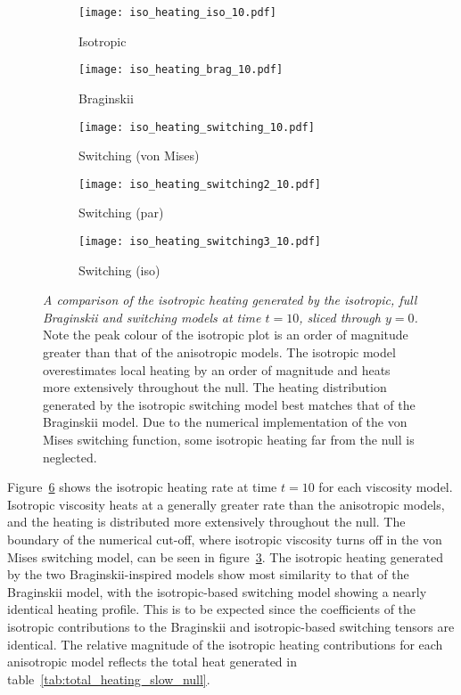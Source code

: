 \begin{figure}[t]
    \centering
    \hfill
    \begin{subfigure}{0.32\textwidth}
      \texttt{[image: iso\_heating\_iso\_10.pdf]}
      \caption{Isotropic}%
      \label{fig:iso_heating_iso_10}
    \end{subfigure}
    \hfill
    \begin{subfigure}{0.32\textwidth}
      \texttt{[image: iso\_heating\_brag\_10.pdf]}
      \caption{Braginskii}%
      \label{fig:iso_heating_brag_10}
    \end{subfigure}
    \hfill
    \begin{subfigure}{0.32\textwidth}
      \texttt{[image: iso\_heating\_switching\_10.pdf]}
      \caption{Switching (von Mises)}%
      \label{fig:iso_heating_switching_10}
    \end{subfigure}
    \begin{subfigure}{0.32\textwidth}
      \texttt{[image: iso\_heating\_switching2\_10.pdf]}
      \caption{Switching (par)}%
      \label{fig:iso_heating_switching2_10}
    \end{subfigure}
    \begin{subfigure}{0.32\textwidth}
      \texttt{[image: iso\_heating\_switching3\_10.pdf]}
      \caption{Switching (iso)}%
      \label{fig:iso_heating_switching3_10}
    \end{subfigure}

    \caption{\emph{A comparison of the isotropic heating generated by the isotropic, full Braginskii and switching models at time $t=10$, sliced through $y=0$.} Note the peak colour of the isotropic plot is an order of magnitude greater than that of the anisotropic models. The isotropic model overestimates local heating by an order of magnitude and heats more extensively throughout the null. The heating distribution generated by the isotropic switching model best matches that of the Braginskii model. Due to the numerical implementation of the von Mises switching function, some isotropic heating far from the null is neglected.}
\label{fig:isotropic_heating}%
\end{figure}

Figure~\ref{fig:isotropic_heating} shows the isotropic heating rate at time $t=10$ for each viscosity model. Isotropic viscosity heats at a generally greater rate than the anisotropic models, and the heating is distributed more extensively throughout the null. The boundary of the numerical cut-off, where isotropic viscosity turns off in the von Mises switching model, can be seen in figure~\ref{fig:iso_heating_switching_10}. The isotropic heating generated by the two Braginskii-inspired models show most similarity to that of the Braginskii model, with the isotropic-based switching model showing a nearly identical heating profile. This is to be expected since the coefficients of the isotropic contributions to the Braginskii and isotropic-based switching tensors are identical. The relative magnitude of the isotropic heating contributions for each anisotropic model reflects the total heat generated in table~\ref{tab:total_heating_slow_null}.


